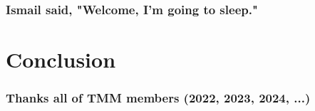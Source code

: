 \documentclass[aspectratio=169]{beamer}
\begin{document}
\begin{frame}
\frametitle{Ismail said, "Welcome, I'm going to sleep."}
\begin{center}

\end{center}
\end{frame}

\section{Conclusion}
\begin{frame}
\frametitle{Thanks all of TMM members (2022, 2023, 2024, ...)}
\begin{center}

\end{center}
\end{frame}
\end{document}
